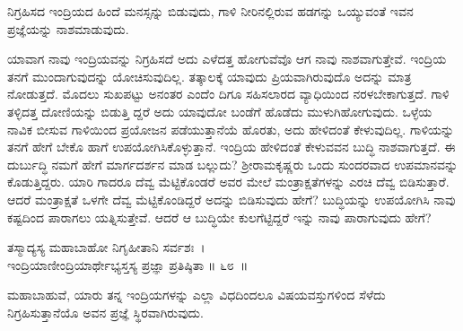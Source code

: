 \begin{artha}
ನಿಗ್ರಹಿಸದ ಇಂದ್ರಿಯದ ಹಿಂದೆ ಮನಸ್ಸನ್ನು ಬಿಡುವುದು, ಗಾಳಿ ನೀರಿನಲ್ಲಿರುವ ಹಡಗನ್ನು ಒಯ್ಯುವಂತೆ ಇವನ ಪ್ರಜ್ಞೆಯನ್ನು ನಾಶಮಾಡುವುದು.
\end{artha}

ಯಾವಾಗ ನಾವು ಇಂದ್ರಿಯವನ್ನು ನಿಗ್ರಹಿಸದೆ ಅದು ಎಳೆದತ್ತ ಹೋಗುವೆವೊ ಆಗ ನಾವು ನಾಶವಾಗುತ್ತೇವೆ. ಇಂದ್ರಿಯ ತನಗೆ ಮುಂದಾಗುವುದನ್ನು ಯೋಚಿಸುವುದಿಲ್ಲ. ತತ್ಕಾಲಕ್ಕೆ ಯಾವುದು ಪ್ರಿಯವಾಗಿರುವುದೊ ಅದನ್ನು ಮಾತ್ರ ನೋಡುತ್ತದೆ. ಮೊದಲು ಸುಖಪಟ್ಟು ಅನಂತರ ಎಂದೆಂ ದಿಗೂ ಸಹಿಸಲಾರದ ವ್ಯಾಧಿಯಿಂದ ನರಳಬೇಕಾಗುತ್ತದೆ. ಗಾಳಿ ತಳ್ಳಿದತ್ತ ದೋಣಿಯನ್ನು ಬಿಡುತ್ತಿ ದ್ದರೆ ಅದು ಯಾವುದೋ ಬಂಡೆಗೆ ಹೊಡೆದು ಮುಳುಗಿಹೋಗುವುದು. ಒಳ್ಳೆಯ ನಾವಿಕ ಬೀಸುವ ಗಾಳಿಯಿಂದ ಪ್ರಯೋಜನ ಪಡೆಯುತ್ತಾನೆಯೆ ಹೊರತು, ಅದು ಹೇಳಿದಂತೆ ಕೇಳುವುದಿಲ್ಲ. ಗಾಳಿಯನ್ನು ತನಗೆ ಹೇಗೆ ಬೇಕೊ ಹಾಗೆ ಉಪಯೋಗಿಸಿಕೊಳ್ಳುತ್ತಾನೆ. ಇಂದ್ರಿಯ ಹೇಳಿದಂತೆ ಕೇಳುವವನ ಬುದ್ಧಿ ನಾಶವಾಗುತ್ತದೆ. ಈ ದುರ್ಬುದ್ಧಿ ನಮಗೆ ಹೇಗೆ ಮಾರ್ಗದರ್ಶನ ಮಾಡ ಬಲ್ಲುದು? ಶ‍್ರೀರಾಮಕೃಷ್ಣರು ಒಂದು ಸುಂದರವಾದ ಉಪಮಾನವನ್ನು ಕೊಡುತ್ತಿದ್ದರು. ಯಾರಿ ಗಾದರೂ ದೆವ್ವ ಮೆಟ್ಟಿಕೊಂಡರೆ ಅವರ ಮೇಲೆ ಮಂತ್ರಾಕ್ಷತೆಗಳನ್ನು ಎರಚಿ ದೆವ್ವ ಬಿಡಿಸುತ್ತಾರೆ. ಆದರೆ ಮಂತ್ರಾಕ್ಷತೆ ಒಳಗೇ ದೆವ್ವ ಮೆಟ್ಟಿಕೊಂಡಿದ್ದರೆ ಅದನ್ನು ಬಿಡಿಸುವುದು ಹೇಗೆ? ಬುದ್ಧಿಯನ್ನು ಉಪಯೋಗಿಸಿ ನಾವು ಕಷ್ಟದಿಂದ ಪಾರಾಗಲು ಯತ್ನಿಸುತ್ತೇವೆ. ಆದರೆ ಆ ಬುದ್ಧಿಯೇ ಕುಲಗೆಟ್ಟಿದ್ದರೆ ಇನ್ನು ನಾವು ಪಾರಾಗುವುದು ಹೇಗೆ?\\

\begin{shloka}
ತಸ್ಮಾದ್ಯಸ್ಯ ಮಹಾಬಾಹೋ ನಿಗೃಹೀತಾನಿ ಸರ್ವಶಃ~।\\ಇಂದ್ರಿಯಾಣೀಂದ್ರಿಯಾರ್ಥೇಭ್ಯಸ್ತಸ್ಯ ಪ್ರಜ್ಞಾ ಪ್ರತಿಷ್ಠಿತಾ \hfill॥ ೬೮~॥
\end{shloka}

\begin{artha}
ಮಹಾಬಾಹುವೆ, ಯಾರು ತನ್ನ ಇಂದ್ರಿಯಗಳನ್ನು ಎಲ್ಲಾ ವಿಧದಿಂದಲೂ ವಿಷಯವಸ್ತುಗಳಿಂದ ಸೆಳೆದು ನಿಗ್ರಹಿಸುತ್ತಾನೆಯೊ ಅವನ ಪ್ರಜ್ಞೆ ಸ್ಥಿರವಾಗಿರುವುದು.
\end{artha}

